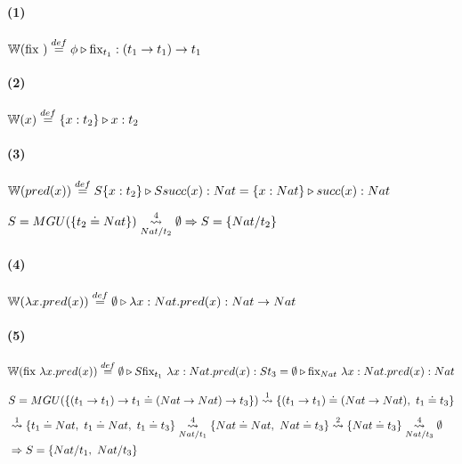 \documentclass[10pt,a4paper]{article}
\begin{document}
\vspace*{5mm}
\begin{multicols}{2}
\paragraph{(1)} $\WFunc(\lambdaFix{}) \equalDef \judgeType{\phi}{\text{fix}_{t_1}}{(t_1\to t_1)\to t_1}$

\paragraph{(2)} $\WFunc(x) \equalDef \judgeType{\{x:t_2\}}{x}{t_2}$

\end{multicols}


\paragraph{(3)} $\WFunc(pred(x)) \equalDef \judgeType{S\{x:t_2\}}{Ssucc(x)}{Nat} = \judgeType{\{x:Nat\}}{succ(x)}{Nat}$

\vspace*{5mm}
$S = MGU(\{t_2\doteq Nat\}) \goesTo{4}{Nat/t_2}  \emptyset \Rightarrow S=\{Nat/t_2\}$

\paragraph{(4)} 
$\WFunc(\lambdaAbsI{x}{pred(x)})
\equalDef \judgeType{\emptyset}{\lambdaAbs{x}{Nat}{pred(x)}}{Nat\to Nat}$

\paragraph{(5)}$
\WFunc(\lambdaFix{\lambdaAbsI{x}{pred(x)}})
\equalDef \judgeType{\emptyset}{S\text{fix}_{t_1}~\lambdaAbs{x}{Nat}{pred(x)}}{St_3} = \judgeType{\emptyset}{\text{fix}_{Nat}~\lambdaAbs{x}{Nat}{pred(x)}}{Nat}
$

\begin{align*}
\vspace*{5mm}
&S = MGU(\{(t_1\to t_1)\to t_1 \doteq (Nat\to Nat)\to t_3\}) \goesTo{1}{}  \{(t_1\to t_1)\doteq (Nat\to Nat),~t_1 \doteq  t_3\} \\
&\goesTo{1}{}  \{t_1\doteq Nat,~ t_1\doteq Nat,~t_1 \doteq  t_3\}  
\goesTo{4}{Nat/t_1}  \{Nat \doteq Nat,~Nat \doteq  t_3\} \goesTo{2}{}  \{Nat \doteq  t_3\} \goesTo{4}{Nat/t_3}  \emptyset \\
&\Rightarrow S=\{Nat/t_1,~Nat/t_3\}
\end{align*}
\end{document}
